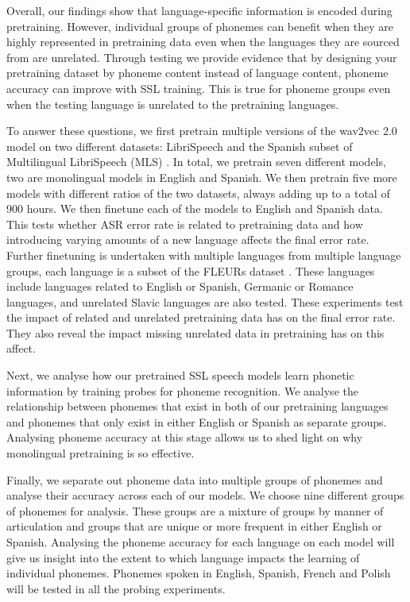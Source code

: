 Overall, our findings show that language-specific information is encoded during pretraining. However, individual groups of phonemes can benefit when they are highly represented in pretraining data even when the languages they are sourced from are unrelated. Through testing we provide evidence that by designing your pretraining dataset by phoneme content instead of language content, phoneme accuracy can improve with SSL training. This is true for phoneme groups even when the testing language is unrelated to the pretraining languages. 

\iffalse
\newpage
To answer these questions, we first pretrain multiple versions of the wav2vec 2.0 \cite{wav2vec} model on two different datasets: LibriSpeech \cite{librispeech} and the Spanish subset of Multilingual LibriSpeech (MLS) \cite{MLS}. In total, we pretrain seven different models, two are monolingual models in English and Spanish. We then pretrain five more models with different ratios of the two datasets, always adding up to a total of 900 hours. We then finetune each of the models to English and Spanish data. This tests whether ASR error rate is related to pretraining data and how introducing varying amounts of a new language affects the final error rate. Further finetuning is undertaken with multiple languages from multiple language groups, each language is a  subset of the FLEURs dataset \cite{FLEURS}. These languages include languages related to English or Spanish, Germanic or Romance languages, and unrelated Slavic languages are also tested. These experiments test the impact of related and unrelated pretraining data has on the final error rate. They also reveal the impact missing unrelated data in pretraining has on this affect.

Next, we analyse how our pretrained SSL speech models learn phonetic information by training probes for phoneme recognition. We analyse the relationship between phonemes that exist in both of our pretraining languages and phonemes that only exist in either English or Spanish as separate groups. Analysing phoneme accuracy at this stage allows us to shed light on why monolingual pretraining is so effective. 


Finally, we separate out phoneme data into multiple groups of phonemes and analyse their accuracy across each of our models. We choose nine different groups of phonemes for analysis. These groups are a mixture of groups by manner of articulation and groups that are unique or more frequent in either English or Spanish. Analysing the phoneme accuracy for each language on each model will give us insight into the extent to which language impacts the learning of individual phonemes. Phonemes spoken in English, Spanish, French and Polish will be tested in all the probing experiments.

